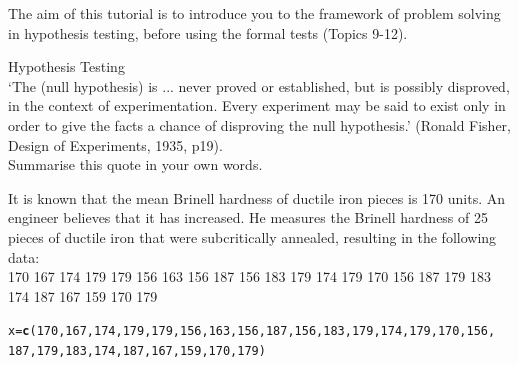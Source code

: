\documentclass[bigtut]{tutorial}\usepackage[]{graphicx}\usepackage[]{color}
\makeatletter
\newcommand{\hlnum}[1]{\textcolor[rgb]{0.686,0.059,0.569}{#1}}%
\newcommand{\hlstd}[1]{\textcolor[rgb]{0.345,0.345,0.345}{#1}}%
\newcommand{\hlkwb}[1]{\textcolor[rgb]{0.69,0.353,0.396}{#1}}%
\newcommand{\hlkwd}[1]{\textcolor[rgb]{0.737,0.353,0.396}{\textbf{#1}}}%
\newenvironment{kframe}{%
 \def\at@end@of@kframe{}%
 \ifinner\ifhmode%
  \def\at@end@of@kframe{\end{minipage}}%
  \begin{minipage}{\columnwidth}%
 \fi\fi%
 \def\FrameCommand##1{\hskip\@totalleftmargin \hskip-\fboxsep
 \colorbox{shadecolor}{##1}\hskip-\fboxsep
     \hskip-\linewidth \hskip-\@totalleftmargin \hskip\columnwidth}%
 \MakeFramed {\advance\hsize-\width
   \@totalleftmargin\z@ \linewidth\hsize
   \@setminipage}}%
 {\par\unskip\endMakeFramed%
 \at@end@of@kframe}
\newenvironment{knitrout}{}{} %
\makeatother
\begin{document}

\begin{tutorial}

The aim of this tutorial is to introduce you to the framework of problem solving in hypothesis testing, before using the formal tests (Topics 9-12).

\begin{questions}

\question Hypothesis Testing \\

`The (null hypothesis) is ... never proved or established, but is possibly disproved, in the context of experimentation. Every experiment may be said to exist only in order to give the facts a chance of disproving the null hypothesis.' (Ronald Fisher, Design of Experiments, 1935, p19). \\

Summarise this quote in your own words.

\question
It is known that the mean Brinell hardness of ductile iron pieces is 170 units.  An engineer believes that it has increased.  He measures the Brinell hardness of 25 pieces of ductile iron that were subcritically annealed, resulting in the following data: \\

170  167	174	179	179 156	163	156	187	156 183	179	174	179	170 156 187	179	183	174 187	167	159	170	179 \\

\begin{knitrout}
\color{fgcolor}\begin{kframe}
\begin{alltt}
\hlstd{x}\hlkwb{=}\hlkwd{c}\hlstd{(}\hlnum{170}\hlstd{,}\hlnum{167}\hlstd{,}\hlnum{174}\hlstd{,}\hlnum{179}\hlstd{,}\hlnum{179}\hlstd{,}\hlnum{156}\hlstd{,}\hlnum{163}\hlstd{,}\hlnum{156}\hlstd{,}\hlnum{187}\hlstd{,}\hlnum{156}\hlstd{,}\hlnum{183}\hlstd{,}\hlnum{179}\hlstd{,}\hlnum{174}\hlstd{,}\hlnum{179}\hlstd{,}\hlnum{170}\hlstd{,}\hlnum{156}\hlstd{,}
    \hlnum{187}\hlstd{,}\hlnum{179}\hlstd{,}\hlnum{183}\hlstd{,}\hlnum{174}\hlstd{,}\hlnum{187}\hlstd{,}\hlnum{167}\hlstd{,}\hlnum{159}\hlstd{,}\hlnum{170}\hlstd{,}\hlnum{179}\hlstd{)}
\end{alltt}
\end{kframe}
\end{knitrout}

\end{questions}
\end{tutorial}
\end{document}
